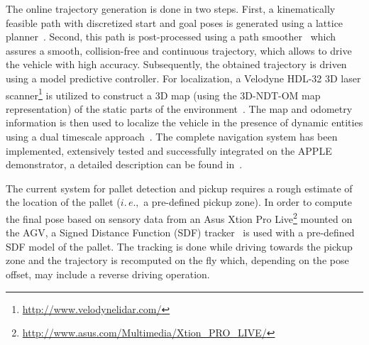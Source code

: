 The online trajectory generation is done in two steps. First, a kinematically feasible path with
discretized start and goal poses is generated using a lattice planner~\cite{Ciri14}. Second, this
path is post-processed using a path smoother~\cite{Andr15} which assures a smooth, collision-free
and continuous trajectory, which allows to drive the vehicle with high accuracy. Subsequently, the
obtained trajectory is driven using a model predictive controller. For localization, a Velodyne
HDL-32 3D laser scanner\footnote{\url{http://www.velodynelidar.com/}} is utilized to construct a 3D
map (using the 3D-NDT-OM map representation) of the static parts of the
environment~\cite{Stoy13}. The map and odometry information is then used to localize the vehicle in
the presence of dynamic entities using a dual timescale approach~\cite{Vale14}. The complete
navigation system has been implemented, extensively tested and successfully integrated on the APPLE
demonstrator, a detailed description can be found in~\cite{Andr15}.

The current system for pallet detection and pickup requires a rough estimate of the location of the
pallet ($i.\,e.,$ a pre-defined pickup zone). In order to compute the final pose based on sensory
data from an Asus Xtion Pro Live\footnote{\url{http://www.asus.com/Multimedia/Xtion_PRO_LIVE/}}
mounted on the AGV, a Signed Distance Function (SDF) tracker~\cite{Cane13} is used with a pre-defined
SDF model of the pallet. The tracking is done while driving towards the pickup zone and the
trajectory is recomputed on the fly which, depending on the pose offset, may include a reverse
driving operation.
%
